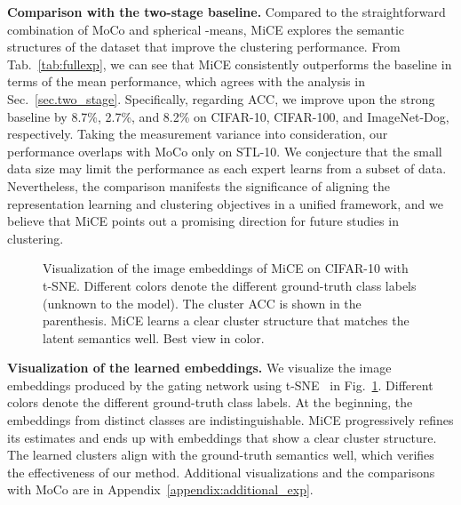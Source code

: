 \documentclass{article} \usepackage{iclr2021_conference,times}
\begin{document}
{\bf Comparison with the two-stage baseline.} Compared to the straightforward combination of MoCo and spherical -means, MiCE explores the semantic structures of the dataset that improve the clustering performance.
From Tab.~\ref{tab:fullexp}, we can see that MiCE consistently outperforms the  baseline in terms of the mean performance, which agrees with the analysis in Sec.~\ref{sec.two_stage}.
Specifically, regarding ACC, we improve upon the strong baseline by 8.7\%, 2.7\%, and 8.2\% on CIFAR-10, CIFAR-100, and ImageNet-Dog, respectively.
Taking the measurement variance into consideration, our performance overlaps with MoCo only on STL-10. We conjecture that the small data size may limit the performance as each expert learns from a subset of data. Nevertheless, the comparison manifests the significance of aligning the representation learning and clustering objectives in a unified framework, and we believe that MiCE points out a promising direction for future studies in clustering. 

\begin{figure}[]
\begin{center}
\end{center}
\caption{Visualization of the image embeddings of MiCE on CIFAR-10 with t-SNE. Different colors denote the different ground-truth class labels (unknown to the model). The cluster ACC is shown in the parenthesis. MiCE learns a clear cluster structure that matches the latent semantics well. Best view in color.
}
\label{fig:tSNE_mice_true_label}
\end{figure}

{\bf Visualization of the learned embeddings.} We visualize the image embeddings produced by the gating network using t-SNE~\citep{maaten2008visualizing} in Fig.~\ref{fig:tSNE_mice_true_label}. Different colors denote the different ground-truth class labels. At the beginning, the embeddings from distinct classes are indistinguishable. MiCE progressively refines its estimates and ends up with embeddings that show a clear cluster structure. The learned clusters align with the ground-truth semantics well, which verifies the effectiveness of our method. Additional visualizations and the comparisons with MoCo are in Appendix~\ref{appendix:additional_exp}.
\end{document}
